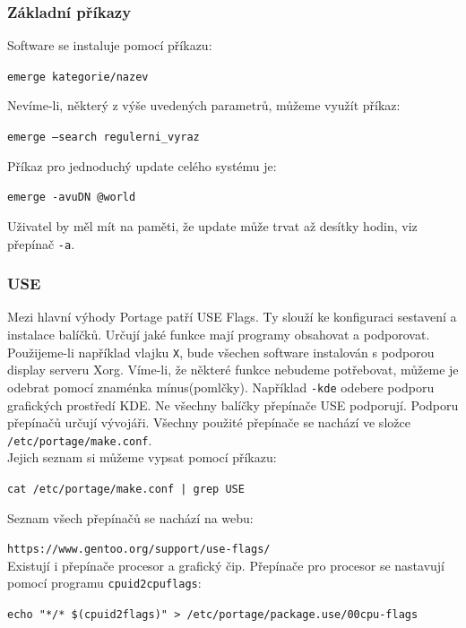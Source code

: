 \documentclass[12pt,a4paper,twoside,]{article}
\begin{document}
{{{{{{{\subsubsection{\textsf{Základní příkazy}}
Software se instaluje pomocí příkazu:  

 \texttt{emerge kategorie/nazev} 
 
\hspace{-1.5em}Nevíme-li, některý z výše uvedených parametrů, můžeme využít příkaz:

\texttt{emerge --search regulerni\_vyraz} 

\hspace{-1.5em}Příkaz pro jednoduchý update celého systému je:

\texttt{emerge -avuDN @world}

\hspace*{-1.5em}Uživatel by měl mít na paměti, že update může trvat až desítky hodin, viz přepínač \texttt{-a}. %

\subsubsection{\textsf{USE}}
Mezi hlavní výhody Portage patří USE Flags. Ty slouží ke konfiguraci sestavení a instalace balíčků. Určují jaké funkce mají programy obsahovat a podporovat.\\
Použijeme-li například vlajku \texttt{X}, bude všechen software instalován s podporou display serveru Xorg. Víme-li, že některé funkce nebudeme potřebovat, můžeme je odebrat pomocí znaménka mínus(pomlčky). Například \texttt{-kde} odebere podporu grafických prostředí KDE.
Ne všechny balíčky přepínače USE podporují. Podporu přepínačů určují vývojáři.
Všechny použité přepínače se nachází ve složce \texttt{/etc/portage/make.conf}. \\
Jejich seznam si můžeme vypsat pomocí příkazu:

\texttt{cat /etc/portage/make.conf | grep USE}

\hspace{-1.5em}Seznam všech přepínačů se nachází na webu:

\texttt{https://www.gentoo.org/support/use-flags/}\\

\hspace{-1.5em}Existují i přepínače procesor a grafický čip. Přepínače pro procesor se nastavují pomocí programu \texttt{cpuid2cpuflags}:


\texttt{echo "*/* \$(cpuid2flags)" > /etc/portage/package.use/00cpu-flags}\\

}}}}}}}
\end{document}
